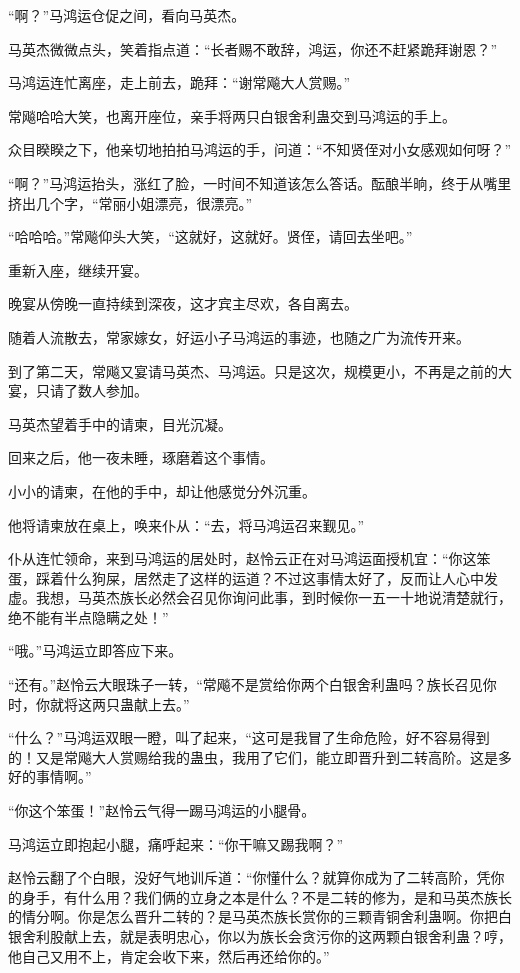 \begin{this_body}
“啊？”马鸿运仓促之间，看向马英杰。

马英杰微微点头，笑着指点道：“长者赐不敢辞，鸿运，你还不赶紧跪拜谢恩？”

马鸿运连忙离座，走上前去，跪拜：“谢常飚大人赏赐。”

常飚哈哈大笑，也离开座位，亲手将两只白银舍利蛊交到马鸿运的手上。

众目睽睽之下，他亲切地拍拍马鸿运的手，问道：“不知贤侄对小女感观如何呀？”

“啊？”马鸿运抬头，涨红了脸，一时间不知道该怎么答话。酝酿半晌，终于从嘴里挤出几个字，“常丽小姐漂亮，很漂亮。”

“哈哈哈。”常飚仰头大笑，“这就好，这就好。贤侄，请回去坐吧。”

重新入座，继续开宴。

晚宴从傍晚一直持续到深夜，这才宾主尽欢，各自离去。

随着人流散去，常家嫁女，好运小子马鸿运的事迹，也随之广为流传开来。

到了第二天，常飚又宴请马英杰、马鸿运。只是这次，规模更小，不再是之前的大宴，只请了数人参加。

马英杰望着手中的请柬，目光沉凝。

回来之后，他一夜未睡，琢磨着这个事情。

小小的请柬，在他的手中，却让他感觉分外沉重。

他将请柬放在桌上，唤来仆从：“去，将马鸿运召来觐见。”

仆从连忙领命，来到马鸿运的居处时，赵怜云正在对马鸿运面授机宜：“你这笨蛋，踩着什么狗屎，居然走了这样的运道？不过这事情太好了，反而让人心中发虚。我想，马英杰族长必然会召见你询问此事，到时候你一五一十地说清楚就行，绝不能有半点隐瞒之处！”

“哦。”马鸿运立即答应下来。

“还有。”赵怜云大眼珠子一转，“常飚不是赏给你两个白银舍利蛊吗？族长召见你时，你就将这两只蛊献上去。”

“什么？”马鸿运双眼一瞪，叫了起来，“这可是我冒了生命危险，好不容易得到的！又是常飚大人赏赐给我的蛊虫，我用了它们，能立即晋升到二转高阶。这是多好的事情啊。”

“你这个笨蛋！”赵怜云气得一踢马鸿运的小腿骨。

马鸿运立即抱起小腿，痛呼起来：“你干嘛又踢我啊？”

赵怜云翻了个白眼，没好气地训斥道：“你懂什么？就算你成为了二转高阶，凭你的身手，有什么用？我们俩的立身之本是什么？不是二转的修为，是和马英杰族长的情分啊。你是怎么晋升二转的？是马英杰族长赏你的三颗青铜舍利蛊啊。你把白银舍利股献上去，就是表明忠心，你以为族长会贪污你的这两颗白银舍利蛊？哼，他自己又用不上，肯定会收下来，然后再还给你的。”


\end{this_body}
